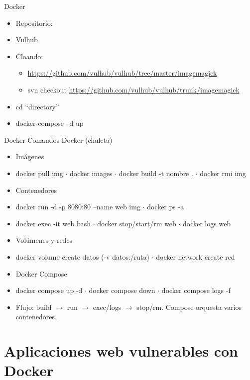 \documentclass[aspectratio=169,11pt]{beamer}
\begin{document}
\begin{frame}[allowframebreaks]{Docker}
\small
  \begin{itemize}
  \item Repositorio:
  \item \href{https://github.com/vulhub/vulhub}{Vulhub}
  \item Cloando:
    \begin{itemize}
    \item \href{https://github.com/vulhub/vulhub/tree/master/imagemagick}{https://github.com/vulhub/vulhub/tree/master/imagemagick}
    \item svn checkout \href{https://github.com/vulhub/vulhub/trunk/imagemagick}{https://github.com/vulhub/vulhub/trunk/imagemagick}
    \end{itemize}
  \item cd ``directory''
  \item docker-compose --d up
  \end{itemize}
\end{frame}

\begin{frame}[allowframebreaks]{Docker}
\small
Comandos Docker (chuleta)
  \begin{itemize}
  \item Imágenes
  \item docker pull img $\cdot$ docker images $\cdot$ docker build -t nombre . $\cdot$ docker rmi img
  \item Contenedores
  \item docker run -d -p 8080:80 --name web img $\cdot$ docker ps -a
  \item docker exec -it web bash $\cdot$ docker stop/start/rm web $\cdot$ docker logs web
  \item Volúmenes y redes
  \item docker volume create datos (-v datos:/ruta) $\cdot$ docker network create red
  \item Docker Compose
  \item docker compose up -d $\cdot$ docker compose down $\cdot$ docker compose logs -f
  \item Flujo: build $\rightarrow$ run $\rightarrow$ exec/logs $\rightarrow$ stop/rm. Compose orquesta varios contenedores.
  \end{itemize}
\end{frame}


\section{Aplicaciones web vulnerables con Docker}
\end{document}
